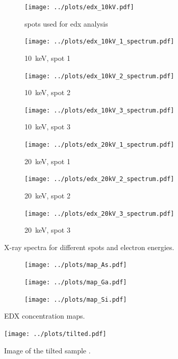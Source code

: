 \begin{figure}
	\centering
	\begin{subfigure}{0.7\linewidth}
		\centering
		\texttt{[image: ../plots/edx\_10kV.pdf]}
		\caption{spots used for \ac{edx} analysis}
		\label{subfig:edx_spots}
	\end{subfigure}
	\begin{subfigure}{0.45\linewidth}
		\centering
		\texttt{[image: ../plots/edx\_10kV\_1\_spectrum.pdf]}
		\caption{\qty{10}{\kilo \electronvolt}, spot 1}
		\label{subfig:10kV_1_spectrum}
	\end{subfigure}
	\begin{subfigure}{0.45\linewidth}
		\centering
		\texttt{[image: ../plots/edx\_10kV\_2\_spectrum.pdf]}
		\caption{\qty{10}{\kilo \electronvolt}, spot 2}
		\label{subfig:10kV_2_spectrum}
	\end{subfigure}
	\begin{subfigure}{0.45\linewidth}
		\centering
		\texttt{[image: ../plots/edx\_10kV\_3\_spectrum.pdf]}
		\caption{\qty{10}{\kilo \electronvolt}, spot 3}
		\label{subfig:10kV_3_spectrum}
	\end{subfigure}
	\begin{subfigure}{0.45\linewidth}
		\centering
		\texttt{[image: ../plots/edx\_20kV\_1\_spectrum.pdf]}
		\caption{\qty{20}{\kilo \electronvolt}, spot 1}
		\label{subfig:20kV_1_spectrum}
	\end{subfigure}
	\begin{subfigure}{0.45\linewidth}
		\centering
		\texttt{[image: ../plots/edx\_20kV\_2\_spectrum.pdf]}
		\caption{\qty{20}{\kilo \electronvolt}, spot 2}
		\label{subfig:20kV_2_spectrum}
	\end{subfigure}
	\begin{subfigure}{0.45\linewidth}
		\centering
		\texttt{[image: ../plots/edx\_20kV\_3\_spectrum.pdf]}
		\caption{\qty{20}{\kilo \electronvolt}, spot 3}
		\label{subfig:20kV_3_spectrum}
	\end{subfigure}
	\caption{X-ray spectra for different spots and electron energies.}
	\label{fig:edx_plots}
\end{figure}

\begin{figure}[t!]
	\centering
	\begin{subfigure}{0.45\linewidth}
		\centering
		\texttt{[image: ../plots/map\_As.pdf]}
		\caption{ }
		\label{subfig:map_as}
	\end{subfigure}
	\begin{subfigure}{0.45\linewidth}
		\centering
		\texttt{[image: ../plots/map\_Ga.pdf]}
		\caption{ }
		\label{subfig:map_ga}
	\end{subfigure}
	\begin{subfigure}{0.45\linewidth}
		\centering
		\texttt{[image: ../plots/map\_Si.pdf]}
		\caption{ }
		\label{subfig:map_si}
	\end{subfigure}
	\caption{EDX concentration maps.}
	\label{fig:edx_maps}
\end{figure}

\begin{figure}[h]
	\centering
	\texttt{[image: ../plots/tilted.pdf]}
	\caption{Image of the tilted sample .}
	\label{fig:depth}
\end{figure}
